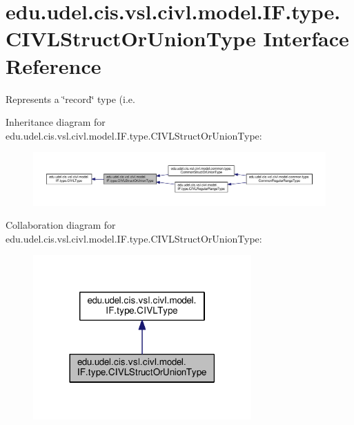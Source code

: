 \hypertarget{interfaceedu_1_1udel_1_1cis_1_1vsl_1_1civl_1_1model_1_1IF_1_1type_1_1CIVLStructOrUnionType}{}\section{edu.\+udel.\+cis.\+vsl.\+civl.\+model.\+I\+F.\+type.\+C\+I\+V\+L\+Struct\+Or\+Union\+Type Interface Reference}
\label{interfaceedu_1_1udel_1_1cis_1_1vsl_1_1civl_1_1model_1_1IF_1_1type_1_1CIVLStructOrUnionType}


Represents a \char`\"{}record\char`\"{} type (i.\+e.  




Inheritance diagram for edu.\+udel.\+cis.\+vsl.\+civl.\+model.\+I\+F.\+type.\+C\+I\+V\+L\+Struct\+Or\+Union\+Type\+:
\nopagebreak
\begin{figure}[H]
\begin{center}
\leavevmode
\includegraphics[width=350pt]{interfaceedu_1_1udel_1_1cis_1_1vsl_1_1civl_1_1model_1_1IF_1_1type_1_1CIVLStructOrUnionType__inherit__graph}
\end{center}
\end{figure}


Collaboration diagram for edu.\+udel.\+cis.\+vsl.\+civl.\+model.\+I\+F.\+type.\+C\+I\+V\+L\+Struct\+Or\+Union\+Type\+:
\nopagebreak
\begin{figure}[H]
\begin{center}
\leavevmode
\includegraphics[width=237pt]{interfaceedu_1_1udel_1_1cis_1_1vsl_1_1civl_1_1model_1_1IF_1_1type_1_1CIVLStructOrUnionType__coll__graph}
\end{center}
\end{figure}
